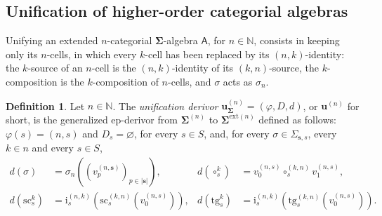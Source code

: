 \documentclass{amsart}
\newcommand{\bb}[1]{\ensuremath{\lvert #1 \rvert}}
\theoremstyle{plain}
\theoremstyle{definition}
\newtheorem{definition}[theorem]{Definition}
\begin{document}
\subsection{Unification of higher-order categorial algebras}\label{SUnificationSub}

Unifying an extended $n$-categorial $\mathbf{\Sigma}$-algebra $\boldsymbol{\mathsf{A}}$, for $n\in\mathbb{N}$, consists in keeping only its $n$-cells, in which every $k$-cell has been replaced by its $(n,k)$-identity: the $k$-source of an $n$-cell is the $(n,k)$-identity of its $(k,n)$-source, the $k$-composition is the $k$-composition of $n$-cells, and $\sigma$ acts as $\sigma_{n}$.

\begin{definition}\label{DUnifDerivor}
Let $n\in\mathbb{N}$. The \emph{unification derivor} $\mathbf{u}^{(n)}_{\mathbf{\Sigma}}=(\varphi,D,d)$, or $\mathbf{u}^{(n)}$ for short, is the generalized ep-derivor from $\mathbf{\Sigma}^{(n)}$ to $\mathbf{\Sigma}^{\mathrm{ext}(n)}$ defined as follows: $\varphi(s)=(n,s)$ and $D_{s}=\varnothing$, for every $s\in S$, and, for every $\sigma\in\Sigma_{\mathbf{s},s}$, every $k\in n$ and every $s\in S$,
\begin{align*}
d(\sigma)&=\sigma_{n}((v^{(n,\mathbf{s})}_{p})_{p\in\bb{\mathbf{s}}}), &
d(\circ^{k}_{s})&=v^{(n,s)}_{0}\circ^{(k,n)}_{s}v^{(n,s)}_{1},\\
d(\mathrm{sc}^{k}_{s})&=\mathrm{i}^{(n,k)}_{s}(\mathrm{sc}^{(k,n)}_{s}(v^{(n,s)}_{0})), &
d(\mathrm{tg}^{k}_{s})&=\mathrm{i}^{(n,k)}_{s}(\mathrm{tg}^{(k,n)}_{s}(v^{(n,s)}_{0})).
\end{align*}
\end{definition}
\end{document}
